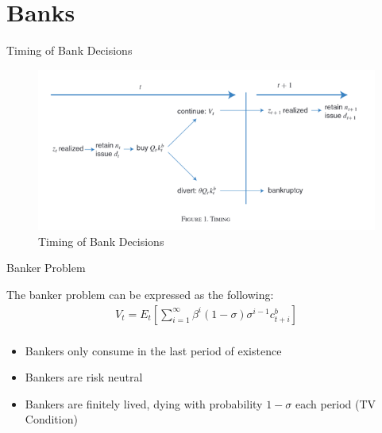 \documentclass[
	11pt, %
	aspectratio=169, %
]{beamer}
\begin{document}
\section{Banks}
\begin{frame}{Timing of Bank Decisions }
    \begin{figure}
        \centering
        \includegraphics[scale=0.75]{banker_timing.png}
        \caption{Timing of Bank Decisions}
        \label{fig:my_label}
    \end{figure}
\end{frame}
\begin{frame}{Banker Problem}
    \begin{definition}
        The banker problem can be expressed as the following:
        \begin{multline}
            V_t=E_t\left[\sum^\infty_{i=1}\beta^i(1-\sigma)\sigma^{i-1}c_{t+i}^b\right]\\
        \end{multline}
        \begin{itemize}
            \item Bankers only consume in the last period of existence
            \item Bankers are risk neutral
            \item Bankers are finitely lived, dying with probability $1-\sigma$ each period (TV Condition)
        \end{itemize}
    \end{definition}
\end{frame}
\end{document}
